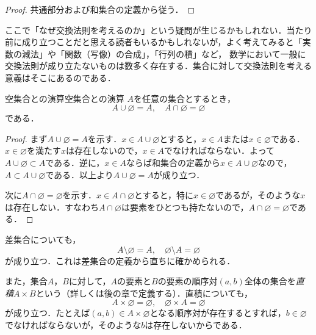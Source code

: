 \begin{tleftbar}
  \begin{proof}
    共通部分および和集合の定義から従う．
  \end{proof}
\end{tleftbar}

\begin{remark}[交換法則を考える意義]
  ここで「なぜ交換法則を考えるのか」という疑問が生じるかもしれない．当たり前に成り立つことだと思える読者もいるかもしれないが，よく考えてみると「実数の減法」や「関数（写像）の合成」，「行列の積」など，
  数学において一般に交換法則が成り立たないものは数多く存在する．集合に対して交換法則を考える意義はそこにあるのである．
\end{remark}

\begin{prop}{空集合との演算}{空集合との演算}
  $A$を任意の集合とするとき，
  \[
    A \cup \varnothing = A, \quad A \cap \varnothing = \varnothing
  \]
  である．
\end{prop}

\begin{tleftbar}
  \begin{proof}
    まず$A \cup \varnothing = A$を示す．$x \in A \cup \varnothing$とすると，$x \in A$または$x \in \varnothing$である．$x \in \varnothing$を満たす$x$は存在しないので，$x \in A$でなければならない．よって$A \cup \varnothing \subset A$である．逆に，$x \in A$ならば和集合の定義から$x \in A \cup \varnothing$なので，$A \subset A \cup \varnothing$である．以上より$A \cup \varnothing = A$が成り立つ．

    次に$A \cap \varnothing = \varnothing$を示す．$x \in A \cap \varnothing$とすると，特に$x \in \varnothing$であるが，そのような$x$は存在しない．すなわち$A \cap \varnothing$は要素をひとつも持たないので，$A \cap \varnothing = \varnothing$である．
  \end{proof}
\end{tleftbar}

\begin{remark}[空集合と差集合・直積]
  差集合についても，
  \[
    A \setminus \varnothing = A, \quad \varnothing \setminus A = \varnothing
  \]
  が成り立つ．これは差集合の定義から直ちに確かめられる．

  また，集合$A$，$B$に対して，$A$の要素と$B$の要素の順序対$(a,b)$全体の集合を\emph{直積}$A \times B$という（詳しくは後の章で定義する）．直積についても，
  \[
    A \times \varnothing = \varnothing, \quad \varnothing \times A = \varnothing
  \]
  が成り立つ．たとえば$(a, b) \in A \times \varnothing$となる順序対が存在するとすれば，$b \in \varnothing$でなければならないが，そのような$b$は存在しないからである．
\end{remark}

